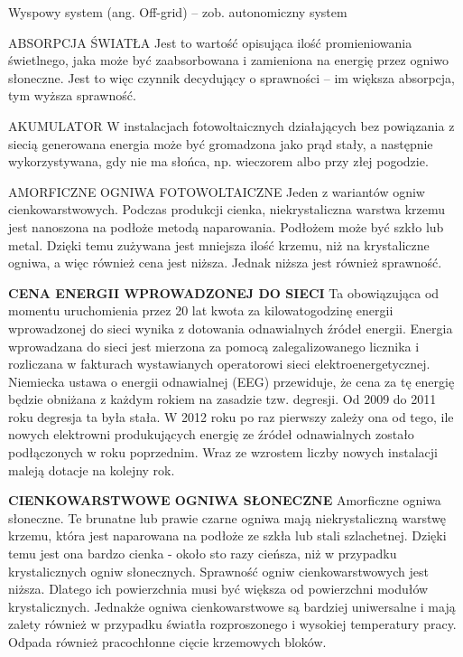 \documentclass[12pt,a4paper]{article}
\begin{document}
Wyspowy system (ang. Off-grid) – zob. autonomiczny system


ABSORPCJA ŚWIATŁA
Jest to wartość opisująca ilość promieniowania świetlnego, jaka może być zaabsorbowana i zamieniona na energię przez ogniwo słoneczne. Jest to więc czynnik decydujący o sprawności – im większa absorpcja, tym wyższa sprawność.

AKUMULATOR
W instalacjach fotowoltaicznych działających bez powiązania z siecią generowana energia może być gromadzona jako prąd stały, a następnie wykorzystywana, gdy nie ma słońca, np. wieczorem albo przy złej pogodzie.


AMORFICZNE OGNIWA FOTOWOLTAICZNE
Jeden z wariantów ogniw cienkowarstwowych. Podczas produkcji cienka, niekrystaliczna warstwa krzemu jest nanoszona na podłoże metodą naparowania. Podłożem może być szkło lub metal. Dzięki temu zużywana jest mniejsza ilość krzemu, niż na krystaliczne ogniwa, a więc również cena jest niższa. Jednak niższa jest również sprawność.


\textbf{CENA ENERGII WPROWADZONEJ DO SIECI}
Ta obowiązująca od momentu uruchomienia przez 20 lat kwota za kilowatogodzinę energii wprowadzonej do sieci wynika z dotowania odnawialnych źródeł energii. Energia wprowadzana do sieci jest mierzona za pomocą zalegalizowanego licznika i rozliczana w fakturach wystawianych operatorowi sieci elektroenergetycznej. Niemiecka ustawa o energii odnawialnej (EEG) przewiduje, że cena za tę energię będzie obniżana z każdym rokiem na zasadzie tzw. degresji. Od 2009 do 2011 roku degresja ta była stała. W 2012 roku po raz pierwszy zależy ona od tego, ile nowych elektrowni produkujących energię ze źródeł odnawialnych zostało podłączonych w roku poprzednim. Wraz ze wzrostem liczby nowych instalacji maleją dotacje na kolejny rok.


\textbf{CIENKOWARSTWOWE OGNIWA SŁONECZNE}
Amorficzne ogniwa słoneczne. Te brunatne lub prawie czarne ogniwa mają niekrystaliczną warstwę krzemu, która jest naparowana na podłoże ze szkła lub stali szlachetnej. Dzięki temu jest ona bardzo cienka - około sto razy cieńsza, niż w przypadku krystalicznych ogniw słonecznych. Sprawność ogniw cienkowarstwowych jest niższa. Dlatego ich powierzchnia musi być większa od powierzchni modułów krystalicznych. Jednakże ogniwa cienkowarstwowe są bardziej uniwersalne i mają zalety również w przypadku światła rozproszonego i wysokiej temperatury pracy. Odpada również pracochłonne cięcie krzemowych bloków.
\end{document}
